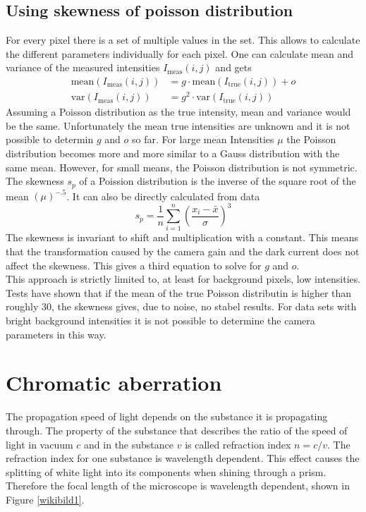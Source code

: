 \subsection{Using skewness of poisson distribution}
For every pixel there is a set of multiple values in the set. This allows to
calculate the different parameters individually for each pixel. One can
calculate mean and variance of the measured intensities $I_\text{meas}(i,j)$ and
gets
\begin{align}
	\text{mean}(I_\text{meas}(i,j))& = g\cdot \text{mean}(I_\text{true}(i,j)) + o \label{meanvarPoiss1}\\
	\text{var}(I_\text{meas}(i,j))& = g^2\cdot\text{var}(I_\text{true}(i,j)) \label{meanvarPoiss2}
\end{align}
Assuming a Poisson distribution as the true intensity, mean and variance would
be the same. Unfortunately the mean true intensities are unknown and it is
not possible to determin $g$ and $o$ so far. For large mean Intensities $\mu$
the Poisson distribution becomes more and more similar to a Gauss distribution
with the same mean. However, for small means, the Poisson distribution is not
symmetric. The skewness $s_p$ of a Poission distribution is the inverse of the
square root of the mean $(\mu)^{-.5}$. It can also be directly
calculated from data
\begin{equation}
	s_p = \frac{1}{n}\sum_{i = 1}^n \left(\frac{x_i - \bar x}{\sigma}\right)^3
\end{equation}
The skewness is invariant to shift and multiplication with a constant. This
means that the transformation caused by the camera gain and the dark current
does not affect the skewness. This gives a third equation to solve for $g$ and
$o$.\\
This approach is strictly limited to, at least for background pixels, low intensities. Tests have shown that if the mean of the true Poisson distributin is higher than roughly 30, the skewness gives, due to noise, no stabel results. For data sets with bright background intensities it is not possible to determine the camera parameters in this way.

\section{Chromatic aberration}
The propagation speed of light depends on the substance it is propagating through. The property of the substance that describes the ratio of the speed of light in vacuum $c$ and in the substance $v$ is called refraction index $n = c/v$.\newline
The refraction index for one substance is wavelength dependent. This effect causes the splitting of white light into its components when shining through a prism.\newline
Therefore the focal length of the microscope is wavelength dependent, shown in Figure \ref{wikibild1}.

